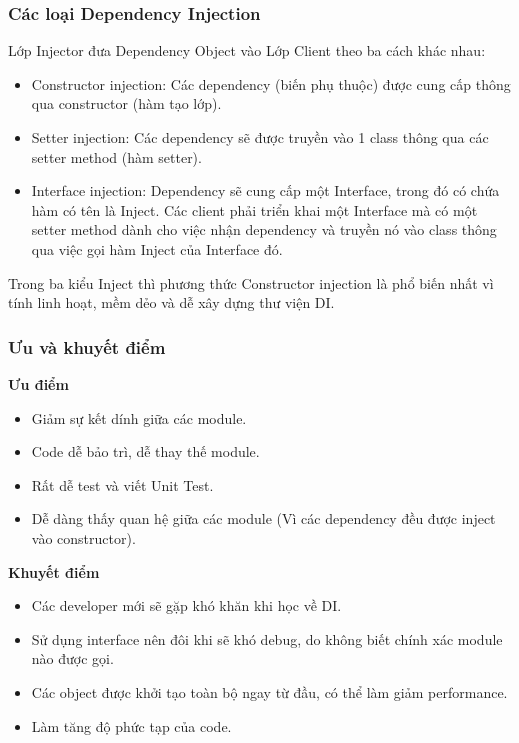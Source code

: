 \subsubsection{Các loại Dependency Injection}
\hspace*{0.5cm} Lớp Injector đưa Dependency Object vào Lớp Client theo ba cách khác nhau:
\begin{itemize}
	\item Constructor injection: Các dependency (biến phụ thuộc) được cung cấp thông qua constructor (hàm tạo lớp).
	\item Setter injection: Các dependency sẽ được truyền vào 1 class thông qua các setter method (hàm setter).
	\item Interface injection: Dependency sẽ cung cấp một Interface, trong đó có chứa hàm có tên là Inject. Các client phải triển khai một Interface mà có một setter method dành cho việc nhận dependency và truyền nó vào class thông qua việc gọi hàm Inject của Interface đó.
\end{itemize}
\hspace*{0.5cm} Trong ba kiểu Inject thì phương thức Constructor injection là phổ biến nhất vì tính linh hoạt, mềm dẻo và dễ xây dựng thư viện DI.
\subsubsection{Ưu và khuyết điểm}
\hspace*{0.5cm} \textbf{Ưu điểm}
\begin{itemize}
	\item Giảm sự kết dính giữa các module.
	\item Code dễ bảo trì, dễ thay thế module.
	\item Rất dễ test và viết Unit Test.
	\item Dễ dàng thấy quan hệ giữa các module (Vì các dependency đều được inject vào constructor).
\end{itemize}
\hspace*{0.5cm} \textbf{Khuyết điểm}
\begin{itemize}
	\item Các developer mới sẽ gặp khó khăn khi học về DI.
	\item Sử dụng interface nên đôi khi sẽ khó debug, do không biết chính xác module nào được gọi.
	\item Các object được khởi tạo toàn bộ ngay từ đầu, có thể làm giảm performance.
	\item Làm tăng độ phức tạp của code.
\end{itemize}
